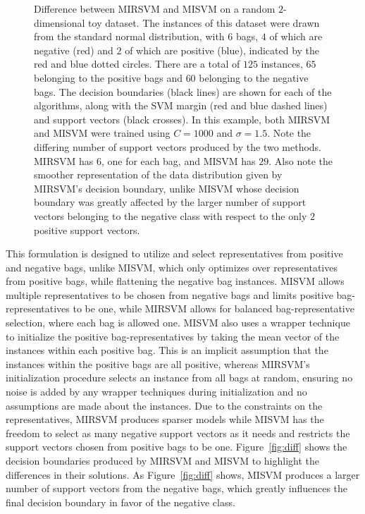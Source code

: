 \begin{figure}
\begin{minipage}{0.5\textwidth}
    \end{minipage}
    \caption{Difference between MIRSVM and MISVM on a random $2$-dimensional toy dataset. The instances of this dataset were drawn from the standard normal distribution, with $6$ bags, $4$ of which are negative (red) and $2$ of which are positive (blue), indicated by the red and blue dotted circles. There are a total of $125$ instances, $65$ belonging to the positive bags and $60$ belonging to the negative bags. The decision boundaries (black lines) are shown for each of the algorithms, along with the SVM margin (red and blue dashed lines) and support vectors (black crosses). In this example, both MIRSVM and MISVM were trained using $C = 1000$ and $\sigma = 1.5$. Note the differing number of support vectors produced by the two methods. MIRSVM has $6$, one for each bag, and MISVM has $29$. Also note the smoother representation of the data distribution given by MIRSVM's decision boundary, unlike MISVM whose decision boundary was greatly affected by the larger number of support vectors belonging to the negative class with respect to the only $2$ positive support vectors. }
\end{figure}
This formulation is designed to utilize and select representatives from positive and negative bags, unlike MISVM, which only optimizes over representatives from positive bags, while flattening the negative bag instances. MISVM allows multiple representatives to be chosen from negative bags and limits positive bag-representatives to be one, while MIRSVM allows for balanced bag-representative selection, where each bag is allowed one. MISVM also uses a wrapper technique to initialize the positive bag-representatives by taking the mean vector of the instances within each positive bag. This is an implicit assumption that the instances within the positive bags are all positive, whereas MIRSVM's initialization procedure selects an instance from all bags at random, ensuring no noise is added by any wrapper techniques during initialization and no assumptions are made about the instances. Due to the constraints on the representatives, MIRSVM produces sparser models while MISVM has the freedom to select as many negative support vectors as it needs and restricts the support vectors chosen from positive bags to be one. Figure~\ref{fig:diff} shows the decision boundaries produced by MIRSVM and MISVM to highlight the differences in their solutions. As Figure~\ref{fig:diff} shows, MISVM produces a larger number of support vectors from the negative bags, which greatly influences the final decision boundary in favor of the negative class.

